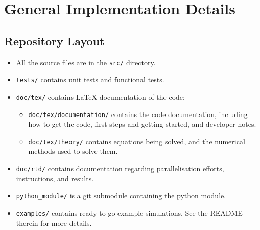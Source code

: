 \newpage
\section{General Implementation Details}



\subsection{Repository Layout}

\begin{itemize} 

    \item All the source files are in the \verb|src/| directory.

    \item \verb|tests/| contains unit tests and functional tests.
	
    \item \verb|doc/tex/| contains LaTeX documentation of the code:

    \begin{itemize}
        \item   \verb|doc/tex/documentation/| contains the code documentation,
                including how to get the code, first steps and getting started,
                and developer notes.

        \item   \verb|doc/tex/theory/| contains equations being solved, and the
                numerical methods used to solve them.

    \end{itemize}

    \item \verb|doc/rtd/| contains documentation regarding parallelisation
        efforts, instructions, and results.

    \item \verb|python_module/| is a git submodule containing the
                \mhutils python module.

    \item \verb|examples/| contains ready-to-go example simulations. See the
                README therein for more details.

\end{itemize}








